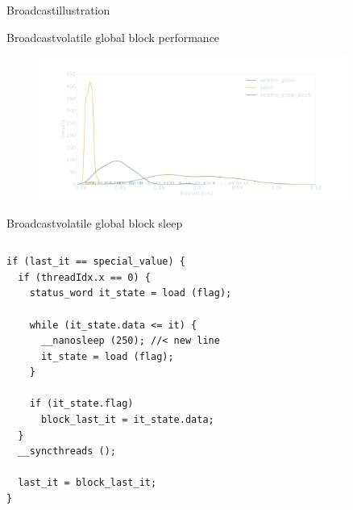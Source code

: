 \documentclass[aspectratio=169,compress]{beamer}
\begin{document}
\begin{frame}[fragile]{Broadcast}{illustration}
	\centering
	\begin{figure}
		\centering
	\end{figure}
\end{frame}

\begin{frame}[fragile]{Broadcast}{volatile global block performance}
\centering
	\begin{figure}
		\includegraphics[width=0.9\textwidth]{density_03.pdf}
	\end{figure}
\end{frame}

\begin{frame}[fragile]{Broadcast}{volatile global block sleep}
\centering
	\begin{columns}
			\begin{column}{0.6\textwidth}
\begin{lstlisting}[showstringspaces=false]
if (last_it == special_value) {
  if (threadIdx.x == 0) {
    status_word it_state = load (flag);

    while (it_state.data <= it) {
      __nanosleep (250); //< new line 
      it_state = load (flag);
    }

    if (it_state.flag)
      block_last_it = it_state.data;
  }
  __syncthreads ();

  last_it = block_last_it;
}
\end{lstlisting}
\end{column}
\end{columns}
\end{frame}
\end{document}
